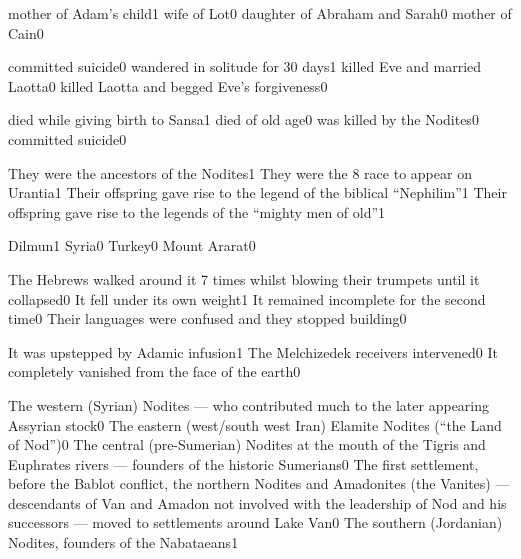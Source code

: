 {mother of Adam's child}{1}
{wife of Lot}{0}
{daughter of Abraham and Sarah}{0}
{mother of Cain}{0}
\qstop

{committed suicide}{0}
{wandered in solitude for 30 days}{1}
{killed Eve and married Laotta}{0}
{killed Laotta and begged Eve's forgiveness}{0}
\qstop


{died while giving birth to Sansa}{1}
{died of old age}{0}
{was killed by the Nodites}{0}
{committed suicide}{0}
\qstop


{They were the ancestors of the Nodites}{1}
{They were the 8 race to appear on Urantia}{1}
{Their offspring gave rise to the legend of the biblical ``Nephilim''}{1}
{Their offspring gave rise to the legends of the ``mighty men of old''}{1}
\qstop

{Dilmun}{1}
{Syria}{0}
{Turkey}{0}
{Mount Ararat}{0}
\qstop

{The Hebrews walked around it 7 times whilst blowing their trumpets until it collapsed}{0}
{It fell under its own weight}{1}
{It remained incomplete for the second time}{0}
{Their languages were confused and they stopped building}{0}
\qstop

{It was upstepped by Adamic infusion}{1}
{The Melchizedek receivers intervened}{0}
{It completely vanished from the face of the earth}{0}
\qstop

{The western (Syrian) Nodites --- who contributed much to the later appearing Assyrian stock}{0}
{The eastern (west/south west Iran) Elamite Nodites (``the Land of Nod'')}{0}
{The central (pre-Sumerian) Nodites at the mouth of the Tigris and Euphrates rivers --- founders of the historic Sumerians}{0}
{The first settlement, before the Bablot conflict, the northern Nodites and Amadonites (the Vanites) --- descendants of Van and Amadon not involved with the leadership of Nod and his successors --- moved to settlements around Lake Van}{0}
{The southern (Jordanian) Nodites, founders of the Nabataeans}{1}
\qstop

